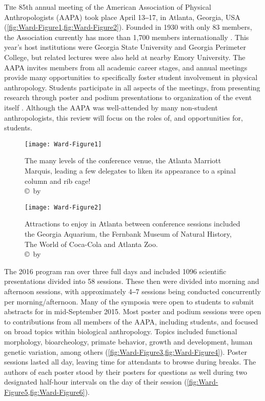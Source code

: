 \documentclass[english]{ijsra}
\begin{document}
\IJSRAopening%


\lettrine{T}he  85th annual meeting of the American Association of Physical Anthropologists (AAPA)
took place April 13‒17, in Atlanta, Georgia, USA (\cref{fig:Ward-Figure1,fig:Ward-Figure2}).
Founded in 1930 with only 83 members, the Association currently has more than 1,700 members internationally \parencite{american2016}.
This year’s host institutions were Georgia State University and Georgia Perimeter College,
but related lectures were also held at nearby Emory University.
The AAPA invites members from all academic career stages, and annual meetings provide many opportunities to
specifically foster student involvement in physical anthropology.
Students participate in all aspects of the meetings, from presenting research through poster and
podium presentations to organization of the event itself \parencite{beasley2016}.
Although the AAPA was well-attended by many non-student anthropologists, this review will focus on the roles of,
and opportunities for, students.
\begin{figure}[!htb] %
		\texttt{[image: Ward-Figure1]}
		\caption{The many levels of the conference venue, the Atlanta Marriott Marquis, leading a few delegates to liken its appearance to a spinal column and rib cage! 
		{\normalfont\scriptsize \\ \copyright\ by \shortauthor}}
		\label{fig:Ward-Figure1}
	\end{figure}

\begin{figure}[!htb] %
		\centering
		\texttt{[image: Ward-Figure2]}
		\caption{Attractions to enjoy in Atlanta between conference sessions included the Georgia Aquarium, the Fernbank Museum of Natural History, The World of Coca-Cola and Atlanta Zoo. 
		{\normalfont\scriptsize \\ \copyright\ by \shortauthor}}
		\label{fig:Ward-Figure2}
	\end{figure}
The 2016 program ran over three full days and included \num{1096} scientific presentations divided into 58 sessions.
These then were divided into morning and afternoon sessions, 
with approximately 4‒7 sessions being conducted concurrently per morning/afternoon. 
Many of the symposia were open to students to submit abstracts for in mid-September 2015.
Most poster and podium sessions were open to contributions from all members of the AAPA, including students,
and focused on broad topics within biological anthropology.
Topics included functional morphology, bioarcheology, primate behavior, growth and development, human genetic variation,
among others (\cref{fig:Ward-Figure3,fig:Ward-Figure4}).
Poster sessions lasted all day, leaving time for attendants to browse during breaks.
The authors of each poster stood by their posters for questions as well during two designated half-hour intervals on
the day of their session (\cref{fig:Ward-Figure5,fig:Ward-Figure6}).
\end{document}
